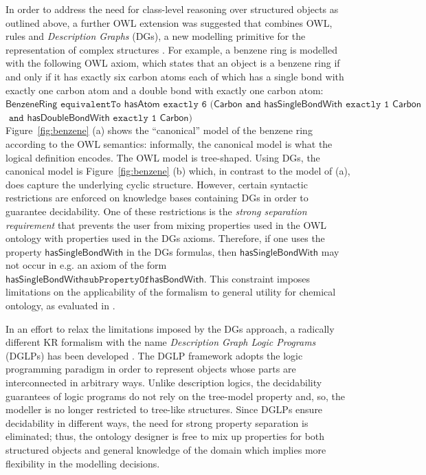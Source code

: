 \documentclass[10pt]{bmc_article}
\newenvironment{bmcformat}{\baselineskip20pt\sloppy\setboolean{publ}{false}}{\baselineskip20pt\sloppy}
\begin{document}
\begin{bmcformat}
In order to address the need for class-level reasoning over structured objects as outlined above, a further OWL extension was suggested that combines OWL, rules and \emph{Description Graphs} (DGs), a new modelling primitive for the representation of complex structures  \cite{mghs09graphs-journal}. For example, a benzene ring is modelled with the following OWL axiom, which states that an object is a benzene ring if and only if it has exactly six carbon atoms each of which has a single bond with exactly one carbon atom and a double bond with exactly one carbon atom:\\
$ \mathsf{BenzeneRing} \texttt{ equivalentTo } \mathsf{hasAtom} \texttt{ exactly 6 } (\mathsf{Carbon} \texttt{ and } \mathsf{hasSingleBondWith} \texttt{ exactly 1 } \mathsf{Carbon}$ \\
$ \texttt{ and } \mathsf{hasDoubleBondWith} \texttt{ exactly 1 } \mathsf{Carbon)}$\\
Figure~\ref{fig:benzene} (a) shows the ``canonical'' model of the benzene ring according to the OWL semantics: informally, the canonical model is what the logical definition encodes. The OWL model is tree-shaped. 
Using DGs, the canonical model is Figure~\ref{fig:benzene} (b) which, in contrast to the model of (a), does capture the underlying cyclic structure. 
However, certain syntactic restrictions are enforced on knowledge bases containing DGs in order to guarantee decidability. One of these restrictions is the \emph{strong separation requirement} that prevents the user from mixing properties used in the OWL ontology with properties used in the DGs axioms. Therefore, if one uses the property $\mathsf{hasSingleBondWith}$ in the DGs formulas, then $\mathsf{hasSingleBondWith}$ may not occur in e.g. an axiom of the form $\mathsf{hasSingleBondWith} \texttt{subPropertyOf} \mathsf{hasBondWith}$. This constraint imposes limitations on the applicability of the formalism to general utility for chemical ontology, as evaluated in \cite{hastingsowled2010}.

In an effort to relax the limitations imposed by the DGs approach, a radically different KR formalism with the name \emph{Description Graph Logic Programs} (DGLPs) has been developed \cite{magka2011}. The DGLP framework adopts the logic programming paradigm in order to represent objects whose parts are interconnected in arbitrary ways. Unlike description logics, the decidability guarantees of logic programs do not rely on the tree-model property and, so, the modeller is no longer restricted to tree-like structures. Since DGLPs ensure decidability in different ways, the need for strong property separation is eliminated; thus, the ontology designer is free to mix up properties for both structured objects and general knowledge of the domain which implies more flexibility in the  modelling decisions.  



\end{bmcformat}
\end{document}
